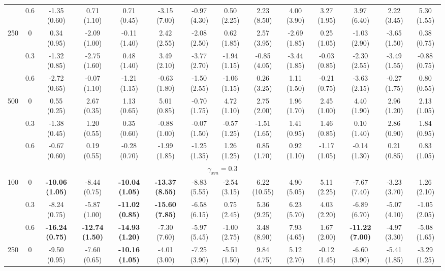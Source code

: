 \documentclass[
  man,mask]{apa6}
\newenvironment{lltable}{\begin{landscape}\centering\begin{ThreePartTable}}{\end{ThreePartTable}\end{landscape}}
\begin{document}
\begin{lltable}
{\begin{longtable}{cccccccccccccc}
 & 0.6 & -1.35 (0.60) & 0.71 (1.10) & 0.71 (0.45) & -3.15 (7.00) & -0.97 (4.30) & 0.50 (2.25) & 2.23 (8.50) & 4.00 (3.90) & 3.27 (1.95) & 3.97 (6.40) & 2.22 (3.45) & 5.30 (1.55)\\
250 & 0 & 0.34 (0.95) & -2.09 (1.00) & -0.11 (1.40) & 2.42 (2.55) & -2.08 (2.50) & 0.62 (1.85) & 2.57 (3.95) & -2.69 (1.85) & 0.25 (1.05) & -1.03 (2.90) & -3.65 (1.50) & 0.38 (0.75)\\
 & 0.3 & -1.32 (0.85) & -2.75 (1.60) & 0.48 (1.40) & 3.49 (2.10) & -3.77 (2.70) & -1.94 (1.15) & -0.85 (4.05) & -3.44 (1.85) & -0.03 (0.85) & -2.30 (2.55) & -3.49 (1.55) & -0.88 (0.75)\\
 & 0.6 & -2.72 (0.65) & -0.07 (1.10) & -1.21 (1.15) & -0.63 (1.80) & -1.50 (2.55) & -1.06 (1.15) & 0.26 (3.25) & 1.11 (1.50) & -0.21 (0.75) & -3.63 (2.15) & -0.27 (1.75) & 0.80 (0.55)\\
500 & 0 & 0.55 (0.25) & 2.67 (0.35) & 1.13 (0.65) & 5.01 (0.85) & -0.70 (1.75) & 4.72 (1.10) & 2.75 (2.00) & 1.96 (1.70) & 2.45 (1.00) & 4.40 (1.90) & 2.96 (1.20) & 2.13 (1.05)\\
 & 0.3 & -1.38 (0.45) & 1.20 (0.55) & 0.35 (0.60) & -0.88 (1.00) & -0.07 (1.50) & -0.57 (1.25) & -1.51 (1.65) & 1.41 (0.95) & 1.46 (0.85) & 0.10 (1.40) & 2.86 (0.90) & 1.84 (0.95)\\
 & 0.6 & -0.67 (0.60) & 0.19 (0.55) & -0.28 (0.70) & -1.99 (1.85) & -1.25 (1.35) & 1.26 (1.25) & 0.85 (1.70) & 0.92 (1.10) & -1.17 (1.05) & -0.14 (1.30) & 0.21 (0.85) & 0.83 (1.05)\\
\multicolumn{14}{c}{$\gamma_{xm} = 0.3$}\\
100 & 0 & \textbf{-10.06 (1.05)} & -8.44 (0.75) & \textbf{-10.04 (1.05)} & \textbf{-13.37 (8.55)} & -8.83 (5.55) & -2.54 (3.15) & 6.22 (10.55) & 4.90 (5.05) & 5.11 (2.25) & -7.67 (7.40) & -3.23 (3.70) & 1.26 (2.10)\\
 & 0.3 & -8.24 (0.75) & -5.87 (1.00) & \textbf{-11.02 (0.85)} & \textbf{-15.60 (7.85)} & -6.58 (6.15) & 0.75 (2.45) & 5.36 (9.25) & 6.23 (5.70) & 4.03 (2.20) & -6.89 (6.70) & -5.07 (4.10) & -1.05 (2.05)\\
 & 0.6 & \textbf{-16.24 (0.75)} & \textbf{-12.74 (1.50)} & \textbf{-14.93 (1.20)} & -7.30 (7.60) & -5.97 (5.45) & -1.00 (2.75) & 3.48 (8.90) & 7.93 (4.65) & 1.67 (2.00) & \textbf{-11.22 (7.00)} & -4.97 (3.30) & -5.08 (1.65)\\
250 & 0 & -9.50 (0.95) & -7.60 (0.65) & \textbf{-10.16 (1.05)} & -4.01 (3.00) & -7.25 (3.90) & -5.51 (1.50) & 9.84 (4.75) & 5.12 (2.70) & -0.12 (1.45) & -6.60 (3.90) & -5.41 (1.85) & -3.29 (1.25)\\

\end{longtable}}
\end{lltable}
\end{document}
